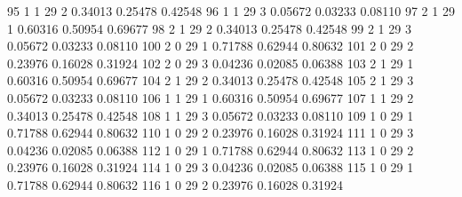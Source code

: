 \documentclass{article}
\begin{document}
\begin{Woutput}
  95      1       1      29       2       0.34013    0.25478    0.42548
  96      1       1      29       3       0.05672    0.03233    0.08110
  97      2       1      29       1       0.60316    0.50954    0.69677
  98      2       1      29       2       0.34013    0.25478    0.42548
  99      2       1      29       3       0.05672    0.03233    0.08110
 100      2       0      29       1       0.71788    0.62944    0.80632
 101      2       0      29       2       0.23976    0.16028    0.31924
 102      2       0      29       3       0.04236    0.02085    0.06388
 103      2       1      29       1       0.60316    0.50954    0.69677
 104      2       1      29       2       0.34013    0.25478    0.42548
 105      2       1      29       3       0.05672    0.03233    0.08110
 106      1       1      29       1       0.60316    0.50954    0.69677
 107      1       1      29       2       0.34013    0.25478    0.42548
 108      1       1      29       3       0.05672    0.03233    0.08110
 109      1       0      29       1       0.71788    0.62944    0.80632
 110      1       0      29       2       0.23976    0.16028    0.31924
 111      1       0      29       3       0.04236    0.02085    0.06388
 112      1       0      29       1       0.71788    0.62944    0.80632
 113      1       0      29       2       0.23976    0.16028    0.31924
 114      1       0      29       3       0.04236    0.02085    0.06388
 115      1       0      29       1       0.71788    0.62944    0.80632
 116      1       0      29       2       0.23976    0.16028    0.31924


\end{Woutput}
\end{document}
